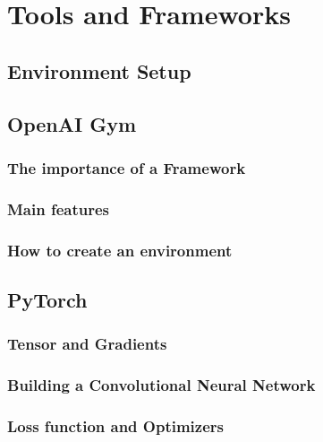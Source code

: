 \chapter{Tools and Frameworks}

\lipsum[10]

\section{Environment Setup}

\lipsum[10]

\section{OpenAI Gym}

\lipsum[10]

\subsection{The importance of a Framework}

\lipsum[10]

\subsection{Main features}

\lipsum[10]

\subsection{How to create an environment}

\lipsum[10]

\section{PyTorch}

\lipsum[10]

\subsection{Tensor and Gradients}

\lipsum[10]

\subsection{Building a Convolutional Neural Network}

\lipsum[10]

\subsection{Loss function and Optimizers}

